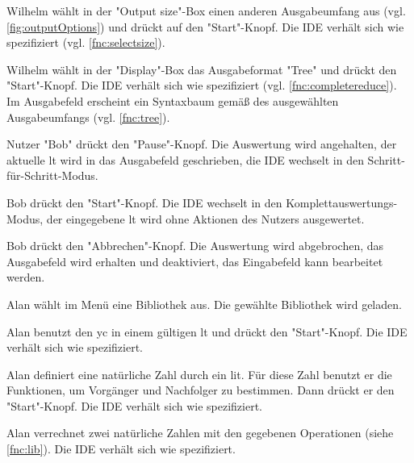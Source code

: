 \documentclass[parskip=full,11pt,twoside]{scrartcl}
\begin{document}
{Wilhelm wählt in der "Output size"-Box einen anderen Ausgabeumfang aus (vgl. \ref{fig:outputOptions}) und drückt auf den "Start"-Knopf.}
{Die IDE verhält sich wie spezifiziert (vgl. \ref{fnc:selectsize}).}

{Wilhelm wählt in der "Display"-Box das Ausgabeformat "Tree" und drückt den "Start"-Knopf.}
{Die IDE verhält sich wie spezifiziert (vgl. \ref{fnc:completereduce}).
 Im Ausgabefeld erscheint ein Syntaxbaum gemäß des ausgewählten Ausgabeumfangs (vgl. \ref{fnc:tree}).}
 

{Nutzer "Bob" drückt den "Pause"-Knopf.}
{Die Auswertung wird angehalten, der aktuelle \gls{lt} wird in das Ausgabefeld geschrieben, die IDE wechselt in den Schritt-für-Schritt-Modus.}

{Bob drückt den "Start"-Knopf.}
{Die IDE wechselt in den Komplettauswertungs-Modus, der eingegebene \gls{lt} wird ohne Aktionen des Nutzers ausgewertet.}

{Bob drückt den "Abbrechen"-Knopf.}
{Die Auswertung wird abgebrochen, das Ausgabefeld wird erhalten und deaktiviert, das Eingabefeld kann bearbeitet werden.}
 

{Alan wählt im Menü eine Bibliothek aus.}
{Die gewählte Bibliothek wird geladen.}

{Alan benutzt den \gls{yc} in einem gültigen \gls{lt} und drückt den "Start"-Knopf.}
{Die IDE verhält sich wie spezifiziert.}

{Alan definiert eine natürliche Zahl durch ein \gls{lit}.
 Für diese Zahl benutzt er die Funktionen, um Vorgänger und Nachfolger zu bestimmen.
 Dann drückt er den "Start"-Knopf.}
{Die IDE verhält sich wie spezifiziert.}

{Alan verrechnet zwei natürliche Zahlen mit den gegebenen Operationen (siehe \ref{fnc:lib}).}
{Die IDE verhält sich wie spezifiziert.}
\end{document}
